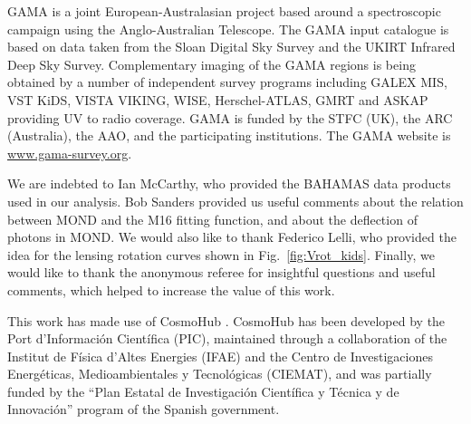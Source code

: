 \documentclass{aa}
\begin{document}
GAMA is a joint European-Australasian project based around a spectroscopic campaign using the Anglo-Australian Telescope. The GAMA input catalogue is based on data taken from the Sloan Digital Sky Survey and the UKIRT Infrared Deep Sky Survey. Complementary imaging of the GAMA regions is being obtained by a number of independent survey programs including GALEX MIS, VST KiDS, VISTA VIKING, WISE, Herschel-ATLAS, GMRT and ASKAP providing UV to radio coverage. GAMA is funded by the STFC (UK), the ARC (Australia), the AAO, and the participating institutions. The GAMA website is \url{www.gama-survey.org}.

We are indebted to Ian McCarthy, who provided the BAHAMAS data products used in our analysis. Bob Sanders provided us useful comments about the relation between MOND and the M16 fitting function, and about the deflection of photons in MOND. We would also like to thank Federico Lelli, who provided the idea for the lensing rotation curves shown in Fig.~\ref{fig:Vrot_kids}. Finally, we would like to thank the anonymous referee for insightful questions and useful comments, which helped to increase the value of this work.

This work has made use of CosmoHub \cite[]{carretero2017,tallada2020}. CosmoHub has been developed by the Port d'Informaci{\'o}n Cient{\'i}fica (PIC), maintained through a collaboration of the Institut de F{\'i}sica d'Altes Energies (IFAE) and the Centro de Investigaciones Energ{\'e}ticas, Medioambientales y Tecnol{\'o}gicas (CIEMAT), and was partially funded by the ``Plan Estatal de Investigaci{\'o}n Cient{\'i}fica y T{\'e}cnica y de Innovaci{\'o}n'' program of the Spanish government.
\end{document}
